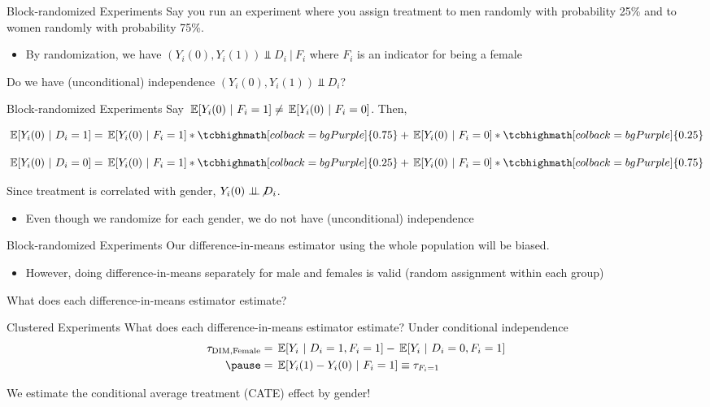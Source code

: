 \documentclass[aspectratio=169,t,11pt,table]{beamer}
\begin{document}
\begin{frame}{Block-randomized Experiments}
  Say you run an experiment where you assign treatment to men randomly with probability 25\% and to women randomly with probability 75\%. 
  \begin{itemize}
    \item By randomization, we have $ (Y_{i}(0), Y_{i}(1)) \Perp D_i \ \vert \ F_i$ where $F_i$ is an indicator for being a female
  \end{itemize}

  Do we have (unconditional) independence $(Y_{i}(0), Y_{i}(1)) \Perp D_i$?
\end{frame}

\begin{frame}{Block-randomized Experiments}
  Say $\expec{Y_i(0)}{F_i = 1} \neq \expec{Y_i(0)}{F_i = 0}$. 
  Then, 

  $$
    \expec{Y_i(0)}{D_i = 1} = \expec{Y_i(0)}{F_i = 1} * \tcbhighmath[colback = bgPurple]{0.75} + \expec{Y_i(0)}{F_i = 0} * \tcbhighmath[colback = bgPurple]{0.25}
  $$

  $$
    \expec{Y_i(0)}{D_i = 0} = \expec{Y_i(0)}{F_i = 1} * \tcbhighmath[colback = bgPurple]{0.25} + \expec{Y_i(0)}{F_i = 0} * \tcbhighmath[colback = bgPurple]{0.75}
  $$
  
  \pause
  \bigskip
  Since treatment is correlated with gender, $Y_{i}(0) \centernot{\Perp} D_i$.
  \begin{itemize}
    \item Even though we randomize for each gender, we do not have (unconditional) independence
  \end{itemize}
\end{frame}

\begin{frame}{Block-randomized Experiments}
  Our difference-in-means estimator using the whole population will be biased.
  \begin{itemize}
    \item However, doing difference-in-means separately for male and females is valid (random assignment within each group)
  \end{itemize}

  \bigskip
  What does each difference-in-means estimator estimate?
\end{frame}

\begin{frame}{Clustered Experiments}
  What does each difference-in-means estimator estimate? Under conditional independence
  \begin{align*}
    \tau_{\text{DIM},\text{Female}} 
    &= \expec{Y_{i}}{D_i = 1, F_i = 1} - \expec{Y_{i}}{D_i = 0, F_i = 1}  \\ \pause
    &= \expec{Y_{i}(1) - Y_{i}(0)}{F_i = 1} \equiv \tau_{F_i = 1}
  \end{align*}

  \bigskip 
  We estimate the conditional average treatment (\alert{CATE}) effect by gender!
\end{frame}
\end{document}
